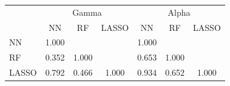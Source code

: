 \begin{tabular}{lccc|ccc}
\hline\hline
 & \multicolumn{3}{c|}{Gamma} & \multicolumn{3}{c}{Alpha} \\
 & NN & RF & LASSO & NN & RF & LASSO \\
\hline
NN&1.000&&&1.000&&\\
RF&0.352&1.000&&0.653&1.000&\\
LASSO&0.792&0.466&1.000&0.934&0.652&1.000\\
\hline\hline
\end{tabular}
